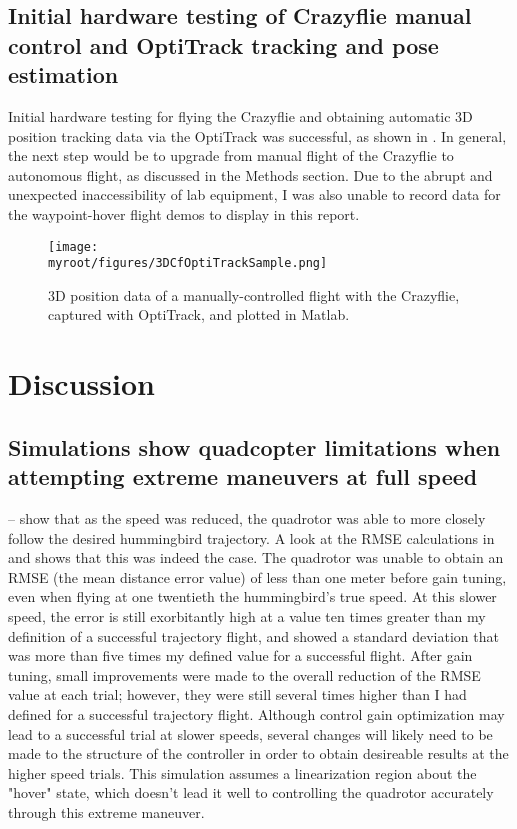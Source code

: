 \documentclass[onecolumn,10pt]{IEEEtran}
\newcommand{\myroot}{../}
\newcommand{\MATLAB}{Matlab}
\begin{document}
\subsection{Initial hardware testing of Crazyflie manual control and OptiTrack tracking and pose estimation}
Initial hardware testing for flying the Crazyflie and obtaining automatic 3D position tracking data via the OptiTrack was successful, as shown in . In general, the next step would be to upgrade from manual flight of the Crazyflie to autonomous flight, as discussed in the Methods section. Due to the abrupt and unexpected inaccessibility of lab equipment, I was also unable to record data for the waypoint-hover flight demos to display in this report.
\begin{figure}
\begin{center}
\texttt{[image: \\myroot/figures/3DCfOptiTrackSample.png]}
\end{center}
\caption{3D  position data  of a manually-controlled flight with the Crazyflie, captured with OptiTrack, and plotted in \MATLAB.}
\label{fig:manualFlight}
\end{figure}
	







\clearpage
\section{Discussion}
\subsection{Simulations show quadcopter limitations when attempting extreme maneuvers at full speed}
-- show that as the speed was reduced, the quadrotor was able to more closely follow the desired hummingbird trajectory. A look at the RMSE calculations in  and  shows that this was indeed the case. The quadrotor was unable to obtain an RMSE (the mean distance error value) of less than one meter before gain tuning, even when flying at one twentieth the hummingbird's true speed. At this slower speed, the error is still exorbitantly high at a value ten times greater than my definition of a successful trajectory flight, and showed a standard deviation that was more than five times my defined value for a successful flight. After gain tuning, small improvements were made to the overall reduction of the RMSE value at each trial; however, they were still several times higher than I had defined for a successful trajectory flight. Although control gain optimization may lead to a successful trial at slower speeds, several changes will likely need to be made to the structure of the controller in order to obtain desireable results at the higher speed trials. This simulation assumes a linearization region about the "hover" state, which doesn't lead it well to controlling the quadrotor accurately through this extreme maneuver.
\end{document}
